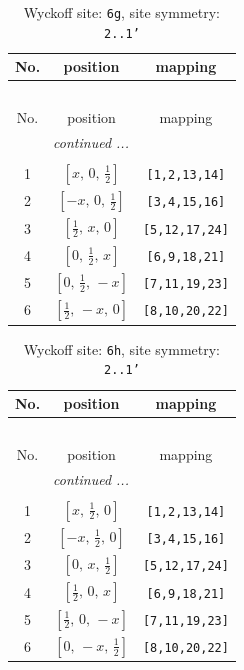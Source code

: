 \documentclass[fleqn,8pt]{jsarticle}
\begin{document}
\renewcommand{\arraystretch}{1.2}
\begin{longtable}{ccc}
\caption{Wyckoff site: {\tt 6g}, site symmetry: {\tt 2..1'}}
 \\
 \hline \hline
No. & position & mapping \\ \hline \endfirsthead

\multicolumn{2}{l}{\tablename\ \thetable{}} \\
 \hline \hline
No. & position & mapping \\ \hline \endhead

 \hline \hline
\multicolumn{2}{r}{\footnotesize\it continued ...} \\ \endfoot

 \hline \hline
\multicolumn{2}{r}{} \\ \endlastfoot

1 & $\left[ x,\, 0,\, \frac{1}{2} \right]$ & {\tt [1,2,13,14]} \\ \hline
2 & $\left[ - x,\, 0,\, \frac{1}{2} \right]$ & {\tt [3,4,15,16]} \\ \hline
3 & $\left[ \frac{1}{2},\, x,\, 0 \right]$ & {\tt [5,12,17,24]} \\ \hline
4 & $\left[ 0,\, \frac{1}{2},\, x \right]$ & {\tt [6,9,18,21]} \\ \hline
5 & $\left[ 0,\, \frac{1}{2},\, - x \right]$ & {\tt [7,11,19,23]} \\ \hline
6 & $\left[ \frac{1}{2},\, - x,\, 0 \right]$ & {\tt [8,10,20,22]} \\
\end{longtable}
\renewcommand{\arraystretch}{1.2}
\begin{longtable}{ccc}
\caption{Wyckoff site: {\tt 6h}, site symmetry: {\tt 2..1'}}
 \\
 \hline \hline
No. & position & mapping \\ \hline \endfirsthead

\multicolumn{2}{l}{\tablename\ \thetable{}} \\
 \hline \hline
No. & position & mapping \\ \hline \endhead

 \hline \hline
\multicolumn{2}{r}{\footnotesize\it continued ...} \\ \endfoot

 \hline \hline
\multicolumn{2}{r}{} \\ \endlastfoot

1 & $\left[ x,\, \frac{1}{2},\, 0 \right]$ & {\tt [1,2,13,14]} \\ \hline
2 & $\left[ - x,\, \frac{1}{2},\, 0 \right]$ & {\tt [3,4,15,16]} \\ \hline
3 & $\left[ 0,\, x,\, \frac{1}{2} \right]$ & {\tt [5,12,17,24]} \\ \hline
4 & $\left[ \frac{1}{2},\, 0,\, x \right]$ & {\tt [6,9,18,21]} \\ \hline
5 & $\left[ \frac{1}{2},\, 0,\, - x \right]$ & {\tt [7,11,19,23]} \\ \hline
6 & $\left[ 0,\, - x,\, \frac{1}{2} \right]$ & {\tt [8,10,20,22]} \\
\end{longtable}
\end{document}
